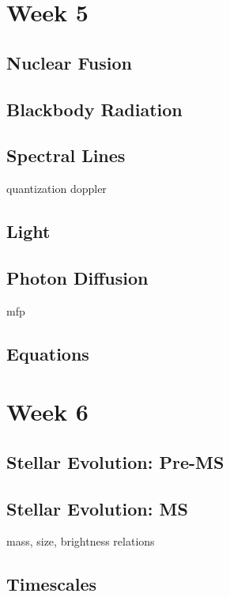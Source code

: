 \documentclass[a4paper,10pt]{article}
\begin{document}
\newpage
\section{Week 5}

\subsection{Nuclear Fusion}

\subsection{Blackbody Radiation}

\subsection{Spectral Lines}
quantization
doppler

\subsection{Light}

\subsection{Photon Diffusion}
mfp

\subsection{Equations}



\newpage
\section{Week 6}

\subsection{Stellar Evolution: Pre-MS}

\subsection{Stellar Evolution: MS}
mass, size, brightness relations

\subsection{Timescales}
\end{document}
